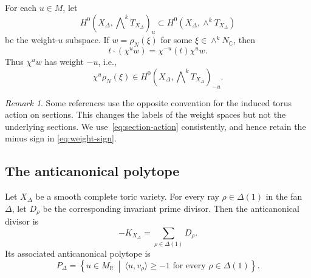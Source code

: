 \documentclass[colorlinks,11pt,reqno]{amsart}
\theoremstyle{definition}
\theoremstyle{remark}
\newtheorem{remark}[theorem]{Remark}
\numberwithin{equation}{section}
\numberwithin{equation}{section}
\newcommand{\C}{\mathbb{C}}
\newcommand{\R}{\mathbb{R}}
\begin{document}
For each $u \in M$, let
\[
H^0\!\left( X_\Delta,\bigwedge\nolimits^kT_{X_\Delta} \right)_u \subset H^0\left(X_\Delta, \wedge^kT_{X_\Delta}\right)
\]
be the weight-\(u\) subspace. If $w=\rho_N(\xi)$ for some $\xi \in \wedge^k N_\C$, then
\begin{equation}\label{eq:weight-sign}
t\cdot(\chi^u w) = \chi^{-u}(t)\chi^u w.
\end{equation}
Thus $\chi^u w$ has weight $-u$, i.e.,
\[
\chi^u\rho_N(\xi) \in H^0\!\left(X_\Delta, \bigwedge\nolimits^kT_{X_\Delta} \right)_{-u}.
\]
\begin{remark}\label{rem:weight-sign}
Some references use the opposite convention for the induced torus action on sections. This changes the labels of the weight spaces but not the underlying sections. We use~\eqref{eq:section-action} consistently, and hence retain the minus sign in \eqref{eq:weight-sign}.
\end{remark}

\subsection{The anticanonical polytope}
Let $X_\Delta$ be a smooth complete toric variety.
For every ray $\rho \in \Delta(1)$ in the fan $\Delta$, let $D_\rho$ be the corresponding invariant prime divisor. Then the anticanonical divisor is
\[
-K_{X_\Delta} = \sum_{\rho\in\Delta(1)} D_\rho.
\]
Its associated anticanonical polytope is
\begin{equation}\label{eq:polytope}
P_\Delta = \left\{ u\in M_{\R}\ \middle|\ \langle u, v_\rho \rangle \geq -1
\text{ for every }\rho \in \Delta(1)
\right\}.
\end{equation}
\end{document}
